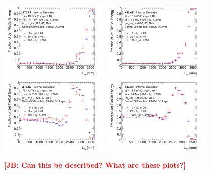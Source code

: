 \begin{figure}[hbtp]
\begin{center}
\includegraphics[width=0.47\textwidth]{figures/caloratio1.png}
\includegraphics[width=0.47\textwidth]{figures/caloratio2.png}\\
\includegraphics[width=0.47\textwidth]{figures/caloratio3.png}
\includegraphics[width=0.47\textwidth]{figures/caloratio4.png}\\
\caption{ {\bf \textcolor{red}{[JB: Can this be described?  What are these plots?]}} }
\label{fig:Caloratio}
\end{center}
\end{figure}

\noindent {\bf \textcolor{red}{[BS: This section kind of just ends after the figure. What is the outcome of the study?]}}

